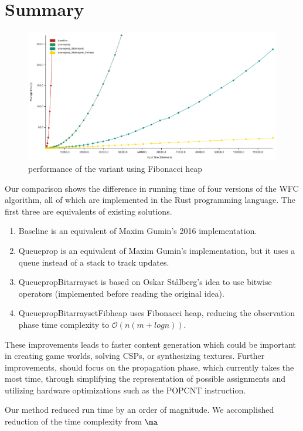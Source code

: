 \documentclass[shortabstract, english, inz]{iithesis}
\begin{document}
\chapter{Summary}
\begin{figure}[H]
\centering
\includegraphics[width=1\textwidth, angle=0]{images/summary.png}
\caption{performance of the variant using Fibonacci heap}
\label{fig:summary}
\end{figure}
Our comparison shows the difference in  running time of four versions of the WFC algorithm, all of which are implemented in the Rust programming language. The first three are equivalents of existing solutions.
\begin{enumerate}
    \item Baseline is an equivalent of Maxim Gumin's 2016 implementation.
    \item Queueprop is an equivalent of Maxim Gumin's implementation, but it uses a queue instead of a stack to track updates.
    \item QueuepropBitarrayset is based on Oskar Stålberg's idea to use bitwise operators (implemented before reading the original idea).
    \item \label{fibheap}QueuepropBitarraysetFibheap uses Fibonacci heap, reducing the observation phase time complexity to \(\mathcal{O}(n(m + log n))\).
\end{enumerate}
These improvements leads to faster content generation which could be important in creating game worlds, solving CSPs, or synthesizing textures. Further improvements, should focus on the propagation phase, which currently takes the most time, through simplifying the representation of possible assignments and utilizing hardware optimizations such as the POPCNT instruction.

Our method reduced run time by an order of magnitude. We accomplished reduction of the time complexity from \(\ma\)

\printbibliography[sorting=none]
\end{document}
